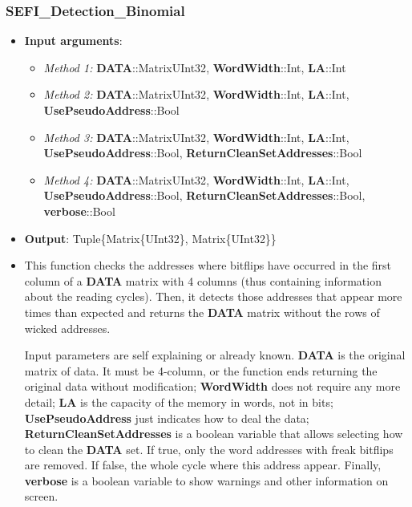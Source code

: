 	\subsubsection*{SEFI\_Detection\_Binomial}\label{Fun:SEFI_Detection_Binomial}
	\begin{itemize}
		\item \textbf{Input arguments}: 
		\begin{itemize}			\item \textit{Method 1:} \textbf{DATA}::Matrix{UInt32},
			\textbf{WordWidth}::Int,
			\textbf{LA}::Int
			
			\item \textit{Method 2:} \textbf{DATA}::Matrix{UInt32},
			\textbf{WordWidth}::Int,
			\textbf{LA}::Int,
			\textbf{UsePseudoAddress}::Bool
			
			\item \textit{Method 3:} \textbf{DATA}::Matrix{UInt32},
			\textbf{WordWidth}::Int,
			\textbf{LA}::Int,
			\textbf{UsePseudoAddress}::Bool,
			\textbf{ReturnCleanSetAddresses}::Bool
			
			
			\item \textit{Method 4:} \textbf{DATA}::Matrix{UInt32},
			\textbf{WordWidth}::Int,
			\textbf{LA}::Int,
			\textbf{UsePseudoAddress}::Bool,
			\textbf{ReturnCleanSetAddresses}::Bool,
			\textbf{verbose}::Bool
		
		\end{itemize}
		\item \textbf{Output}: Tuple\{Matrix\{UInt32\}, Matrix\{UInt32\}\}
		\item This function checks the addresses where bitflips have occurred in the first column of a \textbf{DATA} matrix with 4 columns (thus containing information about the reading cycles). Then, it detects those addresses that appear more times than expected and returns the \textbf{DATA} matrix without the rows of  wicked addresses. 
		
		Input parameters are self explaining or already known. \textbf{DATA} is the original matrix of data. It must be 4-column, or the function ends returning the original data without modification; \textbf{WordWidth} does not require any more detail; \textbf{LA} is the capacity of the memory in words, not in bits; \textbf{UsePseudoAddress} just indicates how to deal the data; \textbf{ReturnCleanSetAddresses} is a boolean variable that allows selecting how to clean the \textbf{DATA} set. If true, only the word addresses with freak bitflips are removed. If false, the whole cycle where this address appear. Finally, \textbf{verbose} is a boolean variable to show warnings and other information on screen.
		

\end{itemize}
